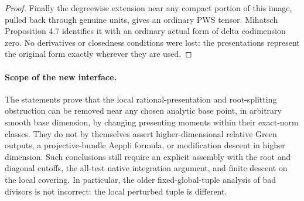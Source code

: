 \begin{proof}
Finally the degreewise extension near any compact portion of
this image, pulled back through genuine units, gives an
ordinary PWS tensor. Mihatsch Proposition 4.7 identifies it
with an ordinary actual form of delta codimension zero.
No derivatives or closedness conditions were lost: the
presentations represent the original form exactly wherever
they are used.
\end{proof}

\paragraph{Scope of the new interface.}
The statements prove that the local rational-presentation and
root-splitting obstruction can be removed near any chosen analytic
base point, in arbitrary smooth base dimension, by changing
presenting moments within their exact-norm classes. They do not
by themselves assert higher-dimensional relative Green outputs,
a projective-bundle Aeppli formula, or modification descent in
higher dimension. Such conclusions still require an explicit
assembly with the root and diagonal cutoffs, the all-test native
integration argument, and finite descent on the local covering.
In particular, the older fixed-global-tuple analysis of bad
divisors is not incorrect: the local perturbed tuple is different.
